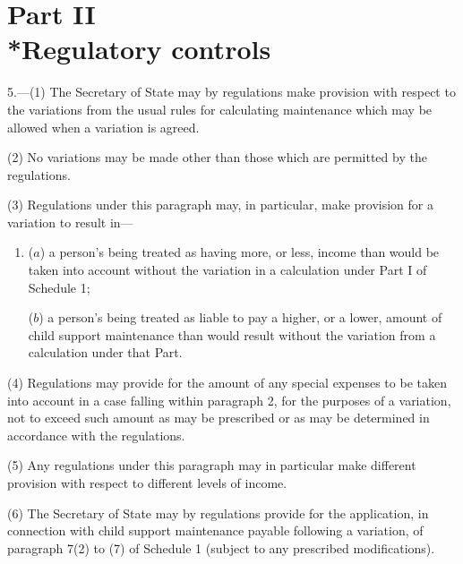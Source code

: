 \documentclass[a4paper]{article}
\begin{document}
{\section[Part II --- Regulatory controls]{Part II\\*Regulatory controls}

5.—(1) The Secretary of State may by regulations make provision with respect
to the variations from the usual rules for calculating maintenance which may be
allowed when a variation is agreed.

(2)
No variations may be made other than those which are permitted by the regulations.

(3)
Regulations under this paragraph may, in particular, make provision for a variation to result in---
\begin{enumerate}\item[]
($a$) a person’s being treated as having more, or less, income than would
be taken into account without the variation in a calculation under
Part I of Schedule 1;

($b$) a person’s being treated as liable to pay a higher, or a lower, amount of
child support maintenance than would result without the variation from a
calculation under that Part.
\end{enumerate}

(4)
Regulations may provide for the amount of any special expenses to be taken into account in a case falling within paragraph 2, for the purposes of a variation, not to exceed such amount as may be prescribed or as may be determined in accordance with the regulations.

(5)
Any regulations under this paragraph may in particular make different provision with respect to different levels of income.

(6)
The Secretary of State may by regulations provide for the application, in connection with child support maintenance payable following a variation, of paragraph 7(2) to (7) of Schedule 1 (subject to any prescribed modifications).


}
\end{document}

